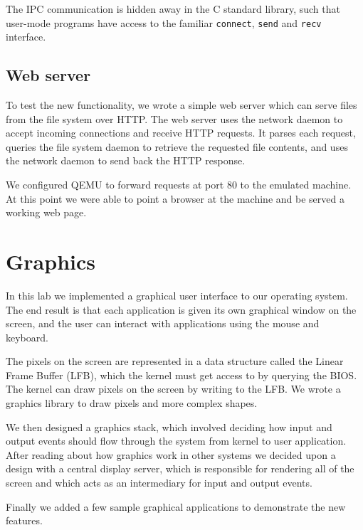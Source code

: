 \documentclass{report}
\begin{document}
The IPC communication is hidden away in the C standard library, such that
user-mode programs have access to the familiar \texttt{connect}, \texttt{send}
and \texttt{recv} interface.


\section{Web server}
To test the new functionality, we wrote a simple web server which can serve
files from the file system over HTTP. The web server uses the network daemon
to accept incoming connections and receive HTTP requests. It parses each
request, queries the file system daemon to retrieve the requested file
contents, and uses the network daemon to send back the HTTP response.

We configured QEMU to forward requests at port 80 to the emulated machine. At
this point we were able to point a browser at the machine and be served a
working web page.









\chapter{Graphics}
\label{sec:graphics}

In this lab we implemented a graphical user interface to our operating system.
The end result is that each application is given its own graphical window on
the screen, and the user can interact with applications using the mouse and
keyboard.

The pixels on the screen are represented in a data structure called the Linear
Frame Buffer (LFB), which the kernel must get access to by querying the BIOS.
The kernel can draw pixels on the screen by writing to the LFB. We wrote a
graphics library to draw pixels and more complex shapes.

We then designed a graphics stack, which involved deciding how input and
output events should flow through the system from kernel to user application.
After reading about how graphics work in other systems \cite{graphicsstack,
windowingsystem, xwindowsystem} we decided upon a design with a central
display server, which is responsible for rendering all of the screen and which
acts as an intermediary for input and output events.

Finally we added a few sample graphical applications to demonstrate the new
features.
\end{document}
